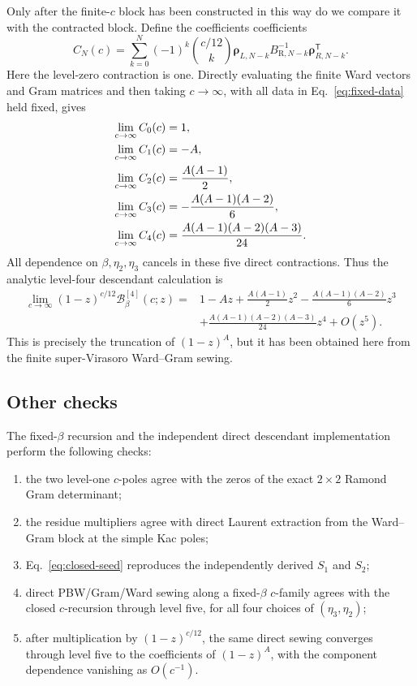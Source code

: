 \documentclass[11pt]{article}
\newcommand{\R}{\mathrm R}
\newcommand{\B}{\mathcal B}
\begin{document}
Only after the finite-\(c\) block has been constructed in this way do
we compare it with the contracted block.  Define the coefficients
coefficients
\begin{equation}
 C_N(c)=
 \sum_{k=0}^{N}(-1)^k\binom{c/12}{k}
 \bm\rho_{L,N-k}B_{\R,N-k}^{-1}
 \bm\rho_{R,N-k}^{\mathsf T}.
 \label{eq:analytic-stripped-level-coefficient}
\end{equation}
Here the level-zero contraction is one.  Directly evaluating the finite
Ward vectors and Gram matrices and then taking \(c\to\infty\), with all
data in Eq.~\eqref{eq:fixed-data} held fixed, gives
\begin{align}
 \lim_{c\to\infty}C_0(c)&=1,\notag\\
 \lim_{c\to\infty}C_1(c)&=-A,\notag\\
 \lim_{c\to\infty}C_2(c)&=\frac{A(A-1)}{2},\notag\\
 \lim_{c\to\infty}C_3(c)&=-\frac{A(A-1)(A-2)}{6},\notag\\
 \lim_{c\to\infty}C_4(c)&=\frac{A(A-1)(A-2)(A-3)}{24}.
 \label{eq:analytic-level-four-result}
\end{align}
All dependence on \(\beta,\eta_2,\eta_3\) cancels in these five direct
contractions.  Thus the analytic level-four descendant calculation is
\begin{equation}
 \boxed{
 \begin{aligned}
 \lim_{c\to\infty}(1-z)^{c/12}\B_\beta^{[4]}(c;z)
 ={}&1-Az+\frac{A(A-1)}2z^2
 -\frac{A(A-1)(A-2)}6z^3\\
 &+\frac{A(A-1)(A-2)(A-3)}{24}z^4+O(z^5).
 \end{aligned}}
 \label{eq:analytic-level-four-block}
\end{equation}
This is precisely the truncation of \((1-z)^A\), but it has been
obtained here from the finite super-Virasoro Ward--Gram sewing.

\subsection{Other checks}

The fixed-\(\beta\) recursion and the independent direct descendant
implementation perform the following checks:
\begin{enumerate}
 \item the two level-one \(c\)-poles agree with the zeros of the exact
 \(2\times2\) Ramond Gram determinant;
 \item the residue multipliers agree with direct Laurent extraction from
 the Ward--Gram block at the simple Kac poles;
 \item Eq.~\eqref{eq:closed-seed} reproduces the independently derived
 \(S_1\) and \(S_2\);
 \item direct PBW/Gram/Ward sewing along a fixed-\(\beta\) \(c\)-family
 agrees with the closed \(c\)-recursion through level five, for all four
 choices of \((\eta_3,\eta_2)\);
 \item after multiplication by \((1-z)^{c/12}\), the same direct sewing
 converges through level five to the coefficients of \((1-z)^A\), with
 the component dependence vanishing as \(O(c^{-1})\).
\end{enumerate}
\end{document}
